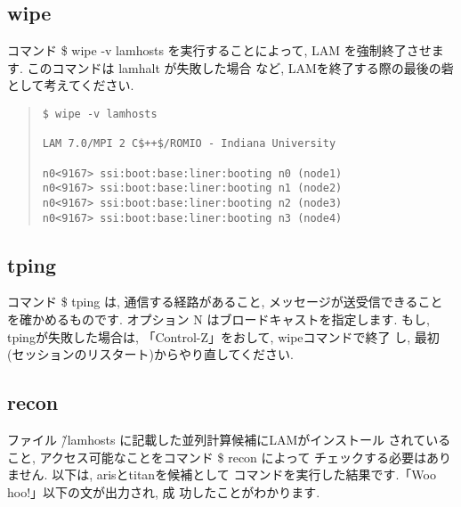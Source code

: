 \documentclass[a4paper,titlepage]{jreport}
\begin{document}
\subsection{wipe}
コマンド \$ wipe -v lamhosts を実行することによって, LAM
を強制終了させます. このコマンドは lamhalt が失敗した場合
など, LAMを終了する際の最後の砦として考えてください.

\begin{quote}
\begin{screen}
\begin{verbatim}
$ wipe -v lamhosts

LAM 7.0/MPI 2 C$++$/ROMIO - Indiana University

n0<9167> ssi:boot:base:liner:booting n0 (node1)
n0<9167> ssi:boot:base:liner:booting n1 (node2)
n0<9167> ssi:boot:base:liner:booting n2 (node3)
n0<9167> ssi:boot:base:liner:booting n3 (node4)
\end{verbatim}
\end{screen}
\end{quote}

\subsection{tping}
コマンド \$ tping は, 通信する経路があること, メッセージが送受信できること
を確かめるものです.  オプション N はブロードキャストを指定します.
もし, tpingが失敗した場合は, 「Control-Z」をおして, wipeコマンドで終了
し, 最初(セッションのリスタート)からやり直してください. 

\subsection{recon}
ファイル \~/lamhosts に記載した並列計算候補にLAMがインストール
されていること, アクセス可能なことをコマンド \$ recon によって
チェックする必要はありません. 以下は, arisとtitanを候補として
コマンドを実行した結果です.「Woo hoo!」以下の文が出力され, 成
功したことがわかります.
\end{document}
